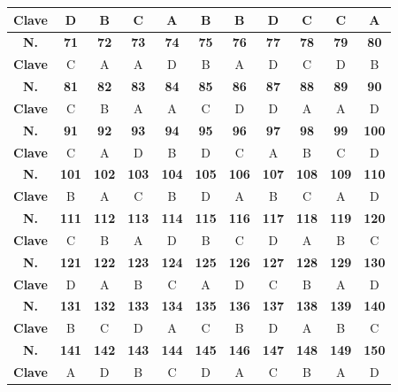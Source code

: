 \begin{center}
\begin{tabular}{|c|c|c|c|c|c|c|c|c|c|c|}
\hline
\textbf{Clave} & D & B & C & A & B & B & D & C & C & A \\
\hline
\textbf{N.} & \textbf{71} & \textbf{72} & \textbf{73} & \textbf{74} & \textbf{75} & \textbf{76} & \textbf{77} & \textbf{78} & \textbf{79} & \textbf{80} \\
\hline
\textbf{Clave} & C & A & A & D & B & A & D & C & D & B \\
\hline
\textbf{N.} & \textbf{81} & \textbf{82} & \textbf{83} & \textbf{84} & \textbf{85} & \textbf{86} & \textbf{87} & \textbf{88} & \textbf{89} & \textbf{90} \\
\hline
\textbf{Clave} & C & B & A & A & C & D & D & A & A & D \\
\hline
\textbf{N.} & \textbf{91} & \textbf{92} & \textbf{93} & \textbf{94} & \textbf{95} & \textbf{96} & \textbf{97} & \textbf{98} & \textbf{99} & \textbf{100} \\
\hline
\textbf{Clave} & C & A & D & B & D & C & A & B & C & D \\
\hline
\textbf{N.} & \textbf{101} & \textbf{102} & \textbf{103} & \textbf{104} & \textbf{105} & \textbf{106} & \textbf{107} & \textbf{108} & \textbf{109} & \textbf{110} \\
\hline
\textbf{Clave} & B & A & C & B & D & A & B & C & A & D \\
\hline
\textbf{N.} & \textbf{111} & \textbf{112} & \textbf{113} & \textbf{114} & \textbf{115} & \textbf{116} & \textbf{117} & \textbf{118} & \textbf{119} & \textbf{120} \\
\hline
\textbf{Clave} & C & B & A & D & B & C & D & A & B & C \\
\hline
\textbf{N.} & \textbf{121} & \textbf{122} & \textbf{123} & \textbf{124} & \textbf{125} & \textbf{126} & \textbf{127} & \textbf{128} & \textbf{129} & \textbf{130} \\
\hline
\textbf{Clave} & D & A & B & C & A & D & C & B & A & D \\
\hline
\textbf{N.} & \textbf{131} & \textbf{132} & \textbf{133} & \textbf{134} & \textbf{135} & \textbf{136} & \textbf{137} & \textbf{138} & \textbf{139} & \textbf{140} \\
\hline
\textbf{Clave} & B & C & D & A & C & B & D & A & B & C \\
\hline
\textbf{N.} & \textbf{141} & \textbf{142} & \textbf{143} & \textbf{144} & \textbf{145} & \textbf{146} & \textbf{147} & \textbf{148} & \textbf{149} & \textbf{150} \\
\hline
\textbf{Clave} & A & D & B & C & D & A & C & B & A & D \\

\end{tabular}
\end{center}
